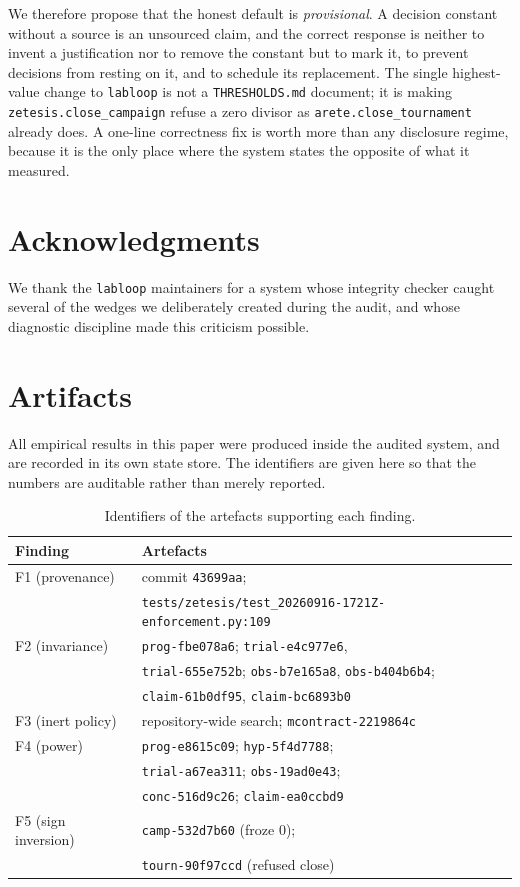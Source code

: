 \documentclass[10pt,twocolumn,letterpaper]{article}
\newcommand{\code}[1]{\texttt{#1}}
\newcommand{\bs}{\allowbreak\hspace{0pt}}
\begin{document}
We therefore propose that the honest default is \emph{provisional}. A decision constant without a
source is an unsourced claim, and the correct response is neither to invent a justification nor to
remove the constant but to mark it, to prevent decisions from resting on it, and to schedule its
replacement. The single highest-value change to \code{labloop} is not a
\code{THRESHOLDS.md} document; it is making \code{zetesis.close\_campaign} refuse a zero divisor
as \code{arete.close\_tournament} already does. A one-line correctness fix is worth more than any
disclosure regime, because it is the only place where the system states the opposite of what it
measured.

\section*{Acknowledgments}
We thank the \code{labloop} maintainers for a system whose integrity checker caught several of the
wedges we deliberately created during the audit, and whose diagnostic discipline made this
criticism possible.

\section*{Artifacts}
\label{sec:artifacts}

All empirical results in this paper were produced inside the audited system, and are recorded in
its own state store. The identifiers are given here so that the numbers are auditable rather than
merely reported.

\begin{table}[h]
\centering
\caption{Identifiers of the artefacts supporting each finding.}
\label{tab:artifacts}
\scriptsize
\begin{tabular}{@{}p{}p{}@{}}
\toprule
\textbf{Finding} & \textbf{Artefacts} \\
\midrule
F1 (provenance) & commit \code{43699aa}; \\
 & \code{tests/zetesis/\bs test\_20260916-1721Z-\bs enforcement.py:109} \\
F2 (invariance) & \code{prog-fbe078a6}; \code{trial-e4c977e6}, \\
 & \code{trial-655e752b}; \code{obs-b7e165a8}, \code{obs-b404b6b4}; \\
 & \code{claim-61b0df95}, \code{claim-bc6893b0} \\
F3 (inert policy) & repository-wide search; \code{mcontract-2219864c} \\
F4 (power) & \code{prog-e8615c09}; \code{hyp-5f4d7788}; \\
 & \code{trial-a67ea311}; \code{obs-19ad0e43}; \\
 & \code{conc-516d9c26}; \code{claim-ea0ccbd9} \\
F5 (sign inversion) & \code{camp-532d7b60} (froze $0$); \\
 & \code{tourn-90f97ccd} (refused close) \\
\bottomrule
\end{tabular}
\end{table}
\end{document}
